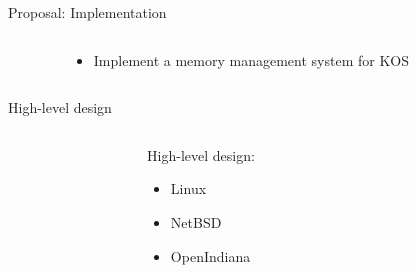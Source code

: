 \documentclass[aspectratio=169]{beamer}
\newcommand{\bi}{\begin{itemize}}
\newcommand{\ei}{\end{itemize}}
\begin{document}
\begin{frame}{Proposal: Implementation}
  \begin{columns}[T]
    \begin{column}{0.2\textwidth}
    \end{column}
    \begin{column}{0.6\textwidth}
      \bi
      \pause
    \item Implement a memory management system for KOS
      \ei
    \end{column}
    \begin{column}{0.2\textwidth}
    \end{column}
  \end{columns}
\end{frame}

\begin{frame}{High-level design}
  \begin{columns}[T]
    \begin{column}{0.2\textwidth}
    \end{column}
    \begin{column}{0.6\textwidth}
      High-level design:
      \bi
    \item Linux
    \item NetBSD
    \item OpenIndiana
      \ei
    \end{column}
    \begin{column}{0.2\textwidth}
    \end{column}
  \end{columns}
\end{frame}
\end{document}
